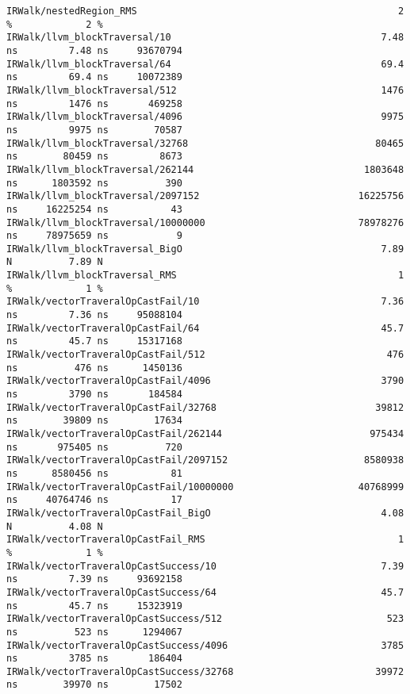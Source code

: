 \begin{code}
\begin{verbatim}
IRWalk/nestedRegion_RMS                                              2 %             2 %
IRWalk/llvm_blockTraversal/10                                     7.48 ns         7.48 ns     93670794
IRWalk/llvm_blockTraversal/64                                     69.4 ns         69.4 ns     10072389
IRWalk/llvm_blockTraversal/512                                    1476 ns         1476 ns       469258
IRWalk/llvm_blockTraversal/4096                                   9975 ns         9975 ns        70587
IRWalk/llvm_blockTraversal/32768                                 80465 ns        80459 ns         8673
IRWalk/llvm_blockTraversal/262144                              1803648 ns      1803592 ns          390
IRWalk/llvm_blockTraversal/2097152                            16225756 ns     16225254 ns           43
IRWalk/llvm_blockTraversal/10000000                           78978276 ns     78975659 ns            9
IRWalk/llvm_blockTraversal_BigO                                   7.89 N          7.89 N
IRWalk/llvm_blockTraversal_RMS                                       1 %             1 %
IRWalk/vectorTraveralOpCastFail/10                                7.36 ns         7.36 ns     95088104
IRWalk/vectorTraveralOpCastFail/64                                45.7 ns         45.7 ns     15317168
IRWalk/vectorTraveralOpCastFail/512                                476 ns          476 ns      1450136
IRWalk/vectorTraveralOpCastFail/4096                              3790 ns         3790 ns       184584
IRWalk/vectorTraveralOpCastFail/32768                            39812 ns        39809 ns        17634
IRWalk/vectorTraveralOpCastFail/262144                          975434 ns       975405 ns          720
IRWalk/vectorTraveralOpCastFail/2097152                        8580938 ns      8580456 ns           81
IRWalk/vectorTraveralOpCastFail/10000000                      40768999 ns     40764746 ns           17
IRWalk/vectorTraveralOpCastFail_BigO                              4.08 N          4.08 N
IRWalk/vectorTraveralOpCastFail_RMS                                  1 %             1 %
IRWalk/vectorTraveralOpCastSuccess/10                             7.39 ns         7.39 ns     93692158
IRWalk/vectorTraveralOpCastSuccess/64                             45.7 ns         45.7 ns     15323919
IRWalk/vectorTraveralOpCastSuccess/512                             523 ns          523 ns      1294067
IRWalk/vectorTraveralOpCastSuccess/4096                           3785 ns         3785 ns       186404
IRWalk/vectorTraveralOpCastSuccess/32768                         39972 ns        39970 ns        17502

\end{verbatim}
\end{code}
